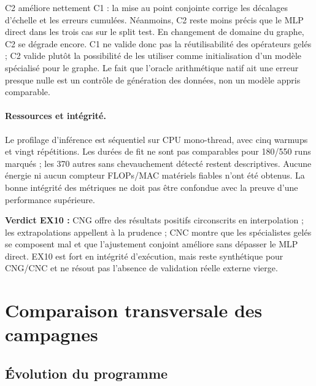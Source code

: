 \documentclass[11pt,a4paper]{article}
\newcommand{\code}[1]{\texttt{\detokenize{#1}}}
\begin{document}
C2 améliore nettement C1 : la mise au point conjointe corrige les décalages d'échelle et les erreurs cumulées. Néanmoins, C2 reste moins précis que le MLP direct dans les trois cas sur le split test. En changement de domaine du graphe, C2 se dégrade encore. C1 ne valide donc pas la réutilisabilité des opérateurs gelés ; C2 valide plutôt la possibilité de les utiliser comme initialisation d'un modèle spécialisé pour le graphe. Le fait que l'oracle arithmétique natif ait une erreur presque nulle est un contrôle de génération des données, non un modèle appris comparable.

\paragraph{Ressources et intégrité.} Le profilage d'inférence est séquentiel sur CPU mono-thread, avec cinq warmups et vingt répétitions. Les durées de fit ne sont pas comparables pour 180/550 runs marqués \code{CONTENDED_OR_UNVERIFIED}; les 370 autres sans chevauchement détecté restent descriptives. Aucune énergie ni aucun compteur FLOPs/MAC matériels fiables n'ont été obtenus. La bonne intégrité des métriques ne doit pas être confondue avec la preuve d'une performance supérieure.

\textbf{Verdict EX10 :} CNG offre des résultats positifs circonscrits en interpolation ; les extrapolations appellent à la prudence ; CNC montre que les spécialistes gelés se composent mal et que l'ajustement conjoint améliore sans dépasser le MLP direct. EX10 est fort en intégrité d'exécution, mais reste synthétique pour CNG/CNC et ne résout pas l'absence de validation réelle externe vierge.

\section{Comparaison transversale des campagnes}

\subsection{Évolution du programme}
\end{document}
